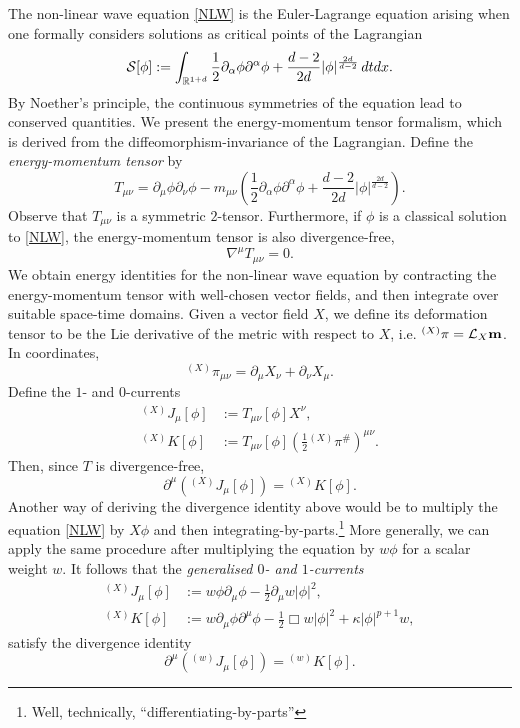 
The non-linear wave equation \eqref{NLW} is the Euler-Lagrange equation arising when one formally considers solutions as critical points of the Lagrangian
	\[
		\mathcal S[\phi] 
			:= \int_{\mathbb R^{1 + d}} \frac12 \partial_\alpha \phi \partial^\alpha \phi + \frac{d - 2}{2d} |\phi|^{\frac{2d}{d - 2}} \, dt dx.
	\]
By Noether's principle, the continuous symmetries of the equation lead to conserved quantities. We present the energy-momentum tensor formalism, which is derived from the diffeomorphism-invariance of the Lagrangian. Define the \emph{energy-momentum tensor} by
	\[
		T_{\mu \nu} 
			= \partial_\mu \phi \partial_\nu \phi - m_{\mu \nu} \left( \frac12 \partial_\alpha \phi \partial^\alpha \phi + \frac{d - 2}{2d} |\phi|^{\frac{2d}{d - 2}}  \right).
	\]	
Observe that $T_{\mu \nu}$ is a symmetric $2$-tensor. Furthermore, if $\phi$ is a classical solution to \eqref{NLW}, the energy-momentum tensor is also divergence-free, 
	\[
		\nabla^\mu T_{\mu \nu} = 0.
	\]
We obtain energy identities for the non-linear wave equation by contracting the energy-momentum tensor with well-chosen vector fields, and then integrate over suitable space-time domains. Given a vector field $X$, we define its deformation tensor to be the Lie derivative of the metric with respect to $X$, i.e. $^{(X)} \pi = \mathcal L_X {\bf m}$. In coordinates, 
	\[
		^{(X)} \pi_{\mu \nu} = \partial_\mu X_\nu + \partial_\nu X_\mu. 
	\]
Define the $1$- and $0$-currents
	\begin{align*}
		^{(X)} J_\mu [\phi]
			&:= T_{\mu \nu} [\phi] X^\nu, \\
		^{(X)} K[\phi]
			&:= T_{\mu \nu} [\phi] \left(\frac12 {^{(X)}} \pi^\# \right)^{\mu \nu}.
	\end{align*}	
Then, since $T$ is divergence-free,
	\begin{equation}\tag{$\nabla$}\label{eq:current}
		\partial^\mu \left({^{(X)}} J_\mu [\phi] \right) = {^{(X)}} K[\phi].
	\end{equation}	
Another way of deriving the divergence identity above would be to multiply the equation \eqref{NLW} by $X\phi$ and then integrating-by-parts.\footnote{Well, technically, ``differentiating-by-parts''} More generally, we can apply the same procedure after multiplying the equation by $w\phi$ for a scalar weight $w$. It follows that the \emph{generalised $0$- and $1$-currents}
	\begin{align*}
		^{(X)} J_\mu [\phi]
			&:=w \phi \partial_\mu \phi - \frac12 \partial_\mu w |\phi|^2, \\
		^{(X)} K[\phi]
			&:= w \partial_\mu \phi \partial^\mu \phi - \frac12 \Box w |\phi|^2 + \kappa |\phi|^{p + 1} w,
	\end{align*}	
satisfy the divergence identity
	\begin{equation}\tag{$\nabla'$}\label{eq:gcurrent}
		\partial^\mu \left({^{(w)}} J_\mu [\phi] \right) = {^{(w)}} K[\phi].
	\end{equation}	
	
